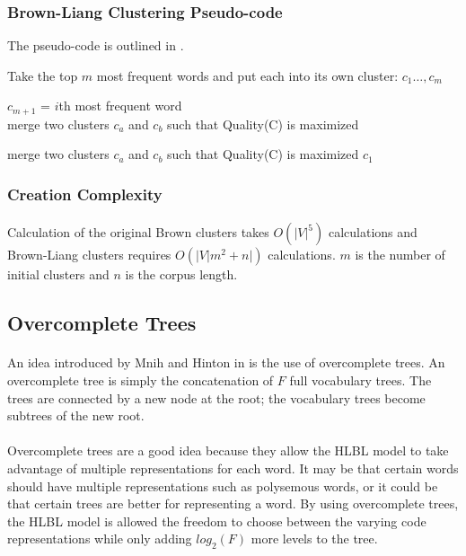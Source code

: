 \documentclass[12pt]{ociamthesis}  %
\begin{document}
\subsubsection{Brown-Liang Clustering Pseudo-code}
The pseudo-code is outlined in \cite{Collins2011}.
\begin{algorithm}
\SetAlgoLined
Take the top $m$ most frequent words and put each into its own cluster: $c_1\dots,c_m$

 {
	$c_{m+1}$ = $i$th most frequent word
	\\
	merge two clusters $c_a$ and $c_b$ such that Quality(C) is maximized
	
}
 {
merge two clusters $c_a$ and $c_b$ such that Quality(C) is maximized
}
\Return $c_1$
\end{algorithm}

\subsubsection{Creation Complexity}
\paragraph{}
Calculation of the original Brown clusters takes $O(|V|^5)$ calculations and Brown-Liang clusters requires $O(|V| m^2+n|)$ calculations. $m$ is the number of initial clusters and $n$ is the corpus length.  

\subsection{Overcomplete Trees}
\paragraph{}
An idea introduced by Mnih and Hinton in \cite{MnihHinton2009} is the use of overcomplete trees. An overcomplete tree is simply the concatenation of $F$ full vocabulary trees. The trees are connected by a new node at the root; the vocabulary trees become subtrees of the new root. 
\paragraph{}
Overcomplete trees are a good idea because they allow the HLBL model to take advantage of multiple representations for each word. It may be that certain words should have multiple representations such as polysemous words, or it could be that certain trees are better for representing a word. By using overcomplete trees, the HLBL model is allowed the freedom to choose between the varying code representations while only adding $log_2(F)$ more levels to the tree.
\end{document}
